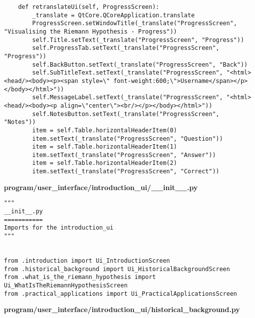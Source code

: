 \documentclass{article}
\begin{document}
\begin{lstlisting}
    def retranslateUi(self, ProgressScreen):
        _translate = QtCore.QCoreApplication.translate
        ProgressScreen.setWindowTitle(_translate("ProgressScreen", "Visualising the Riemann Hypothesis - Progress"))
        self.Title.setText(_translate("ProgressScreen", "Progress"))
        self.ProgressTab.setText(_translate("ProgressScreen", "Progress"))
        self.BackButton.setText(_translate("ProgressScreen", "Back"))
        self.SubTitleText.setText(_translate("ProgressScreen", "<html><head/><body><p><span style=\" font-weight:600;\">Username</span></p></body></html>"))
        self.MessageLabel.setText(_translate("ProgressScreen", "<html><head/><body><p align=\"center\"><br/></p></body></html>"))
        self.NotesButton.setText(_translate("ProgressScreen", "Notes"))
        item = self.Table.horizontalHeaderItem(0)
        item.setText(_translate("ProgressScreen", "Question"))
        item = self.Table.horizontalHeaderItem(1)
        item.setText(_translate("ProgressScreen", "Answer"))
        item = self.Table.horizontalHeaderItem(2)
        item.setText(_translate("ProgressScreen", "Correct"))
\end{lstlisting}


\textbf{program/user\_interface/introduction\_ui/\_\_init\_\_.py}

\begin{lstlisting}
"""
__init__.py
===========
Imports for the introduction_ui
"""


from .introduction import Ui_IntroductionScreen
from .historical_background import Ui_HistoricalBackgroundScreen
from .what_is_the_riemann_hypothesis import Ui_WhatIsTheRiemannHypothesisScreen
from .practical_applications import Ui_PracticalApplicationsScreen
\end{lstlisting}


\textbf{program/user\_interface/introduction\_ui/historical\_background.py}
\end{document}
